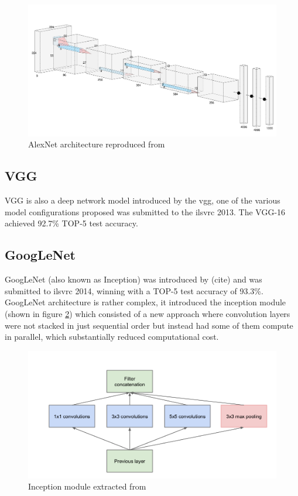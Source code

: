 \begin{figure}[h]
	\includegraphics[scale=0.3]{archivos/alexnet.png}
	\centering
	\caption{AlexNet architecture reproduced from \cite{AlexNet}}
	\label{alexnet}
\end{figure}

\subsection{VGG}
VGG is also a deep network model introduced by the \gls{vgg}, one of the various model configurations proposed \cite{DBLP:journals/corr/SimonyanZ14a} was submitted to the \gls{ilsvrc} 2013. The VGG-16 achieved 92.7\% TOP-5 test accuracy.

\subsection{GoogLeNet}
GoogLeNet (also known as Inception) was introduced by (cite) and was submitted to \gls{ilsvrc} 2014, winning with a TOP-5 test accuracy of 93.3\%. GoogLeNet architecture is rather complex, it introduced the inception module (shown in figure \ref{inception}) which consisted of a new approach where convolution layers were not stacked in just sequential order but instead had some of them compute in parallel, which substantially reduced computational cost.

\begin{figure}
	\includegraphics[scale=0.3]{archivos/inception_module.png}
	\centering
	\caption{Inception module extracted from \cite{DBLP:journals/corr/SzegedyLJSRAEVR14}}
	\label{inception}
\end{figure}

